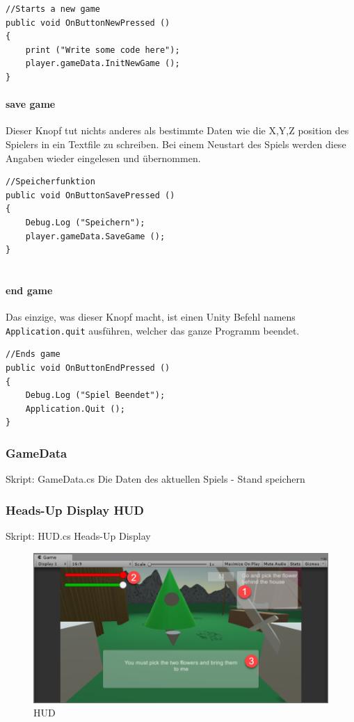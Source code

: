 \begin{lstlisting}
//Starts a new game
public void OnButtonNewPressed ()
{
	print ("Write some code here");
	player.gameData.InitNewGame ();
}

\end{lstlisting}

\paragraph{save game}
Dieser Knopf tut nichts anderes als bestimmte Daten wie die X,Y,Z position des Spielers in ein Textfile zu schreiben. Bei einem Neustart des Spiels werden diese Angaben wieder eingelesen und  übernommen.

\begin{lstlisting}
//Speicherfunktion
public void OnButtonSavePressed ()
{
	Debug.Log ("Speichern");
	player.gameData.SaveGame ();
}
	
\end{lstlisting}

\paragraph{end game}
Das einzige, was dieser Knopf macht, ist einen Unity Befehl namens \lstinline{Application.quit}  ausführen, welcher das ganze Programm beendet. 

\begin{lstlisting}
//Ends game
public void OnButtonEndPressed ()
{
	Debug.Log ("Spiel Beendet");
	Application.Quit ();
}
\end{lstlisting}

\subsubsection{GameData}
Skript: GameData.cs
Die Daten des aktuellen Spiels
- Stand speichern
\\


\subsubsection{Heads-Up Display HUD}
Skript: HUD.cs
Heads-Up Display

\begin{figure}[H]
\includegraphics[scale=0.8]{screenshots/hud.png}
\caption{HUD}
\end{figure}

